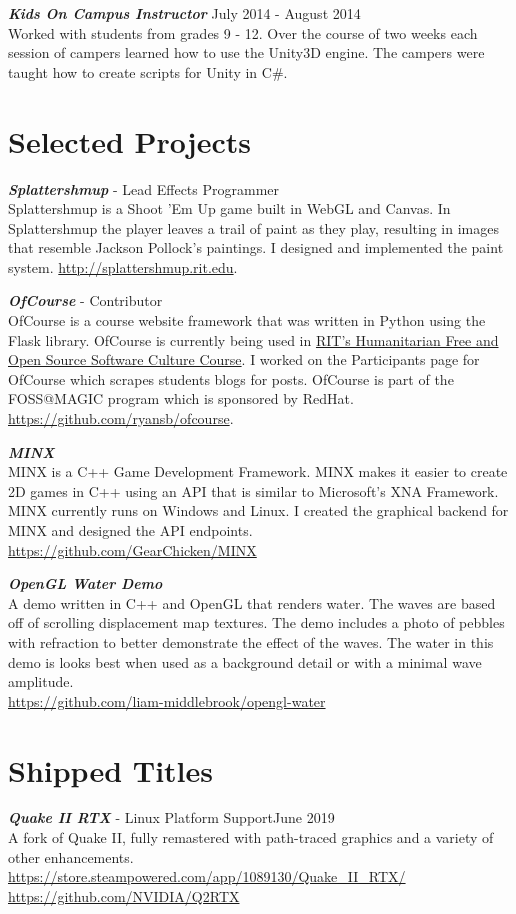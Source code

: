 \documentclass[line,margin]{res}
\begin{document}
\begin{resume}
{\textbf{\emph{Kids On Campus Instructor}}} \hfill July 2014 - August 2014\\
Worked with students from grades 9 - 12. Over the course of two weeks each session of campers
learned how to use the Unity3D engine. The campers were taught how to create scripts for Unity
in C\#.


\section{Selected Projects}

{\textbf{\emph{Splattershmup}}} - Lead Effects Programmer\\
Splattershmup is a Shoot 'Em Up game built in WebGL and Canvas. In Splattershmup the player leaves
a trail of paint as they play, resulting in images that resemble Jackson Pollock's paintings.
I designed and implemented the paint system.
\url{http://splattershmup.rit.edu}.

{\textbf{\emph{OfCourse}}} - Contributor\\
OfCourse is a course website framework that was written in Python using the Flask library.
OfCourse is currently being used in \href{http://hfoss-fossrit.rhcloud.com}{RIT's Humanitarian
Free and Open Source Software Culture Course}. I worked on the Participants page for OfCourse
which scrapes students blogs for posts. OfCourse is part of the FOSS@MAGIC
program which is sponsored by RedHat.\\
\url{https://github.com/ryansb/ofcourse}.

{\textbf{\emph{MINX}}}\\
MINX is a C++ Game Development Framework. MINX makes it easier to create 2D games in C++ using an API
that is similar to Microsoft's XNA Framework. MINX currently runs on Windows and Linux. I created the
graphical backend for MINX and designed the API endpoints.\\
\url{https://github.com/GearChicken/MINX}

{\textbf{\emph{OpenGL Water Demo}}}\\
A demo written in C++ and OpenGL that renders water. The waves are based off of scrolling displacement
map textures. The demo includes a photo of pebbles with refraction to better demonstrate the effect
of the waves. The water in this demo is looks best when used as a background detail or with a minimal
wave amplitude.\\
\url{https://github.com/liam-middlebrook/opengl-water}

\section{Shipped Titles}
{\textbf{\emph{Quake II RTX}}} - Linux Platform Support\hfill June 2019\\
A fork of Quake II, fully remastered with path-traced graphics and a variety of
other enhancements.
\url{https://store.steampowered.com/app/1089130/Quake_II_RTX/}\\
\url{https://github.com/NVIDIA/Q2RTX}


\end{resume}
\end{document}
